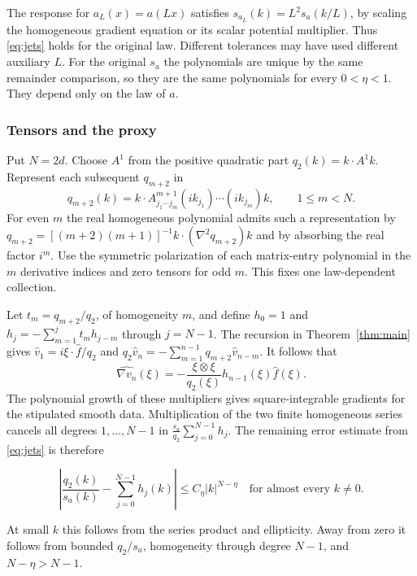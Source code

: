 \documentclass[11pt]{article}
\begin{document}
The response for \(a_L(x)=a(Lx)\) satisfies \(s_{a_L}(k)=L^2s_a(k/L)\), by scaling the homogeneous gradient equation or its scalar potential multiplier. Thus \eqref{eq:jets} holds for the original law. Different tolerances may have used different auxiliary \(L\). For the original \(s_a\) the polynomials are unique by the same remainder comparison, so they are the same polynomials for every \(0<\eta<1\). They depend only on the law of \(a\).

\subsubsection{Tensors and the proxy}\label{tensors-and-the-proxy}

Put \(N=2d\). Choose \(A^1\) from the positive quadratic part \(q_2(k)=k\cdot A^1 k\). Represent each subsequent \(q_{m+2}\) in \[
q_{m+2}(k)= k\cdot A^{m+1}_{j_1\cdots j_m}(ik_{j_1})\cdots(ik_{j_m})k,
\qquad 1\le m<N .
\] For even \(m\) the real homogeneous polynomial admits such a representation by \(q_{m+2}=[(m+2)(m+1)]^{-1} k\cdot (\nabla^2 q_{m+2})k\) and by absorbing the real factor \(i^m\). Use the symmetric polarization of each matrix-entry polynomial in the \(m\) derivative indices and zero tensors for odd \(m\). This fixes one law-dependent collection.

Let \(t_m=q_{m+2}/q_2\), of homogeneity \(m\), and define \(h_0=1\) and \(h_j=-\sum_{m=1}^j t_m h_{j-m}\) through \(j=N-1\). The recursion in Theorem~\ref{thm:main} gives \(\widehat v_1=i\xi\cdot\widehat f/q_2\) and \(q_2\widehat v_n=-\sum_{m=1}^{n-1}q_{m+2}\widehat v_{n-m}\). It follows that \[
\widehat{\nabla v_n}(\xi)
=-\frac{\xi\otimes\xi}{q_2(\xi)}h_{n-1}(\xi)\widehat f(\xi).
\] The polynomial growth of these multipliers gives square-integrable gradients for the stipulated smooth data. Multiplication of the two finite homogeneous series cancels all degrees \(1,\ldots,N-1\) in \(\frac{s_a}{q_2}\sum_{j=0}^{N-1}h_j\). The remaining error estimate from \eqref{eq:jets} is therefore

\begin{equation}\label{eq:proxy-error}
\left|\frac{q_2(k)}{s_a(k)}-\sum_{j=0}^{N-1}h_j(k)\right|
\le C_\eta |k|^{N-\eta}
\quad\text{for almost every }k\ne0.
\end{equation}

At small \(k\) this follows from the series product and ellipticity. Away from zero it follows from bounded \(q_2/s_a\), homogeneity through degree \(N-1\), and \(N-\eta>N-1\).
\end{document}
